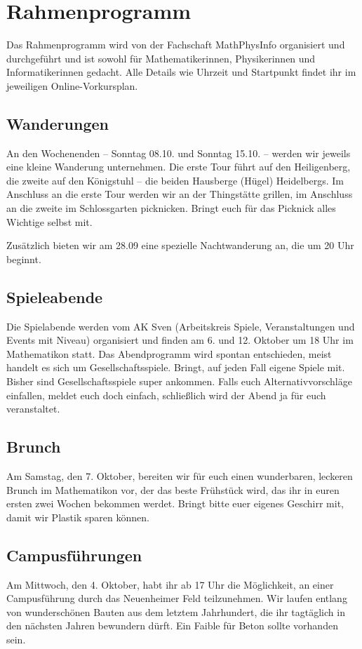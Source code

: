 \newpage
\section{Rahmenprogramm}
\label{vorkurs-rahmenprogramm}

Das Rahmenprogramm wird von der Fachschaft MathPhysInfo organisiert und durchgeführt und ist sowohl für Mathematikerinnen, Physikerinnen und Informatikerinnen gedacht. Alle Details wie Uhrzeit und Startpunkt findet ihr im jeweiligen Online-Vorkursplan.

\subsection{Wanderungen}
An den Wochenenden -- Sonntag 08.10. und Sonntag 15.10. -- werden wir jeweils eine kleine Wanderung unternehmen. Die erste Tour führt auf den Heiligenberg, die zweite auf den Königstuhl -- die beiden Hausberge (Hügel) Heidelbergs. Im Anschluss an die erste Tour werden wir an der Thingstätte grillen, im Anschluss an die zweite im Schlossgarten picknicken. Bringt euch für das Picknick alles Wichtige selbst mit.

Zusätzlich bieten wir am 28.09 eine spezielle Nachtwanderung an, die um 20 Uhr beginnt.

\subsection{Spieleabende}
Die Spielabende werden vom AK Sven (Arbeitskreis Spiele, Veranstaltungen und Events mit Niveau) organisiert und finden am 6. und 12. Oktober um 18 Uhr im \gls{Mathematikon} statt. Das Abendprogramm wird spontan entschieden, meist handelt es sich um Gesellschaftsspiele. Bringt, auf jeden Fall eigene Spiele mit. Bisher sind Gesellschaftsspiele super ankommen. Falls euch Alternativvorschläge einfallen, meldet euch doch einfach, schließlich wird der Abend ja für euch veranstaltet.

\subsection{Brunch}
Am Samstag, den 7. Oktober, bereiten wir für euch einen wunderbaren, leckeren Brunch im \gls{Mathematikon} vor, der das beste Frühstück wird, das ihr in euren ersten zwei Wochen bekommen werdet. Bringt bitte euer eigenes Geschirr mit, damit wir Plastik sparen können.

\subsection{Campusführungen}
Am Mittwoch, den 4. Oktober, habt ihr ab 17 Uhr die Möglichkeit, an einer Campusführung durch das Neuenheimer Feld teilzunehmen. Wir laufen entlang von wunderschönen Bauten aus dem letztem Jahrhundert, die ihr tagtäglich in den nächsten Jahren bewundern dürft. Ein Faible für Beton sollte vorhanden sein.

